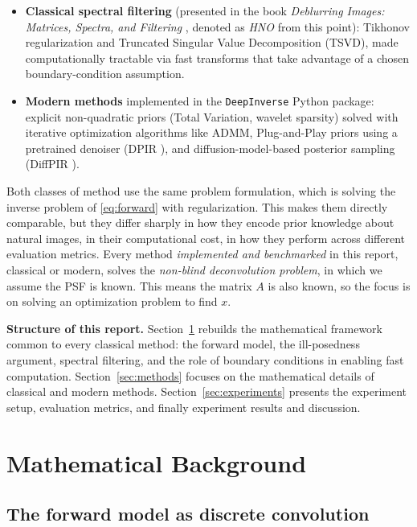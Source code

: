 \documentclass[12pt, a4paper, onecolumn]{article}
\theoremstyle{plain}          %
\theoremstyle{definition}     %
\theoremstyle{remark}
\begin{document}
\begin{itemize}
    \item \textbf{Classical spectral filtering} (presented in the book \textit{Deblurring Images: Matrices, Spectra, and Filtering} \cite{hno2006}, denoted as \emph{HNO} from this point):
    Tikhonov regularization and Truncated Singular Value Decomposition (TSVD), made computationally tractable via
    fast transforms that take advantage of a chosen boundary-condition assumption.
    \item \textbf{Modern methods} implemented in the \texttt{DeepInverse}
    \cite{deepinv2023} Python package: explicit non-quadratic priors (Total Variation,
    wavelet sparsity) solved with iterative optimization algorithms like ADMM, Plug-and-Play priors using a
    pretrained denoiser (DPIR \cite{dpir2021}), and diffusion-model-based
    posterior sampling (DiffPIR \cite{diffpir2023}).
\end{itemize}

Both classes of method use the same problem formulation, which is solving the inverse problem of \ref{eq:forward} with regularization. This makes them directly
comparable, but they differ sharply in how they encode prior knowledge about natural images, in their computational cost, in how they perform across different evaluation metrics. Every method \emph{implemented and benchmarked} in this report, classical or modern, solves the \textit{non-blind deconvolution problem}, in which we
assume the PSF is known. This means the matrix $A$ is also known, so the focus is on solving an optimization problem to find $x$.

\textbf{Structure of this report.} Section~\ref{sec:background} rebuilds
the mathematical framework common to every classical method: the forward model, the ill-posedness argument, spectral filtering, and the role of boundary conditions in enabling fast computation. Section~\ref{sec:methods} focuses on the mathematical details of classical and modern methods. Section~\ref{sec:experiments} presents the experiment setup, evaluation metrics, and finally experiment results and discussion.

\section{Mathematical Background}
\label{sec:background}

\subsection{The forward model as discrete convolution}
\end{document}
